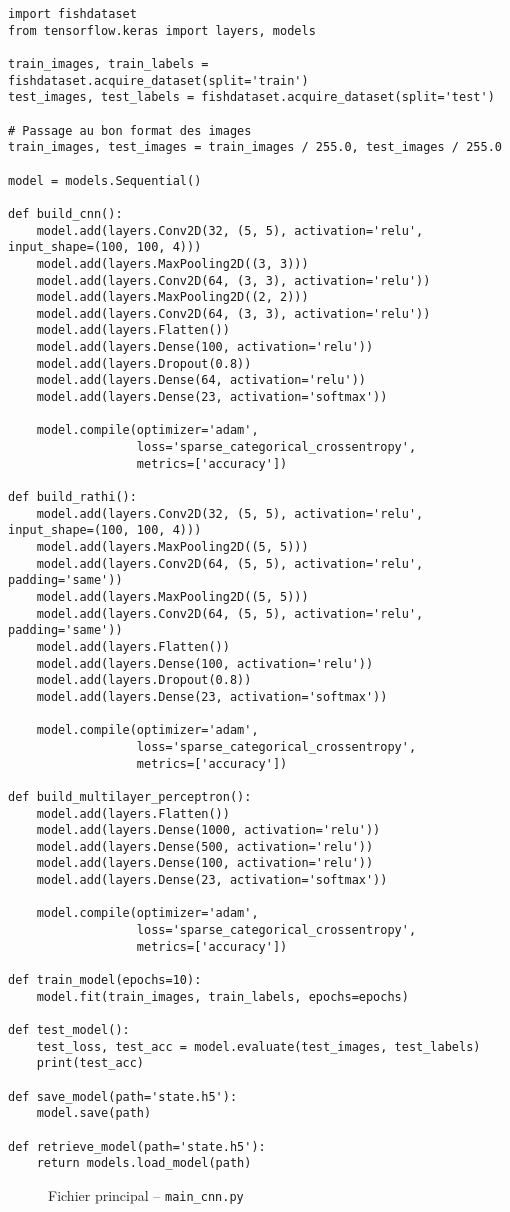 \documentclass{article}
\begin{document}
  \begin{lstlisting}[style=Py]
import fishdataset
from tensorflow.keras import layers, models

train_images, train_labels = fishdataset.acquire_dataset(split='train')
test_images, test_labels = fishdataset.acquire_dataset(split='test')

# Passage au bon format des images
train_images, test_images = train_images / 255.0, test_images / 255.0

model = models.Sequential()

def build_cnn():
    model.add(layers.Conv2D(32, (5, 5), activation='relu', input_shape=(100, 100, 4)))
    model.add(layers.MaxPooling2D((3, 3)))
    model.add(layers.Conv2D(64, (3, 3), activation='relu'))
    model.add(layers.MaxPooling2D((2, 2)))
    model.add(layers.Conv2D(64, (3, 3), activation='relu'))
    model.add(layers.Flatten())
    model.add(layers.Dense(100, activation='relu'))
    model.add(layers.Dropout(0.8))
    model.add(layers.Dense(64, activation='relu'))
    model.add(layers.Dense(23, activation='softmax'))

    model.compile(optimizer='adam',
                  loss='sparse_categorical_crossentropy',
                  metrics=['accuracy'])

def build_rathi():
    model.add(layers.Conv2D(32, (5, 5), activation='relu', input_shape=(100, 100, 4)))
    model.add(layers.MaxPooling2D((5, 5)))
    model.add(layers.Conv2D(64, (5, 5), activation='relu', padding='same'))
    model.add(layers.MaxPooling2D((5, 5)))
    model.add(layers.Conv2D(64, (5, 5), activation='relu', padding='same'))
    model.add(layers.Flatten())
    model.add(layers.Dense(100, activation='relu'))
    model.add(layers.Dropout(0.8))
    model.add(layers.Dense(23, activation='softmax'))

    model.compile(optimizer='adam',
                  loss='sparse_categorical_crossentropy',
                  metrics=['accuracy'])

def build_multilayer_perceptron():
    model.add(layers.Flatten())
    model.add(layers.Dense(1000, activation='relu'))
    model.add(layers.Dense(500, activation='relu'))
    model.add(layers.Dense(100, activation='relu'))
    model.add(layers.Dense(23, activation='softmax'))

    model.compile(optimizer='adam',
                  loss='sparse_categorical_crossentropy',
                  metrics=['accuracy'])

def train_model(epochs=10):
    model.fit(train_images, train_labels, epochs=epochs)

def test_model():
    test_loss, test_acc = model.evaluate(test_images, test_labels)
    print(test_acc)

def save_model(path='state.h5'):
    model.save(path)

def retrieve_model(path='state.h5'):
    return models.load_model(path)
  \end{lstlisting}
  \vspace*{-0.3cm}
  \begin{figure}[ht] %
    \caption{Fichier principal -- \texttt{main\_cnn.py}}
  \end{figure}
\end{document}
